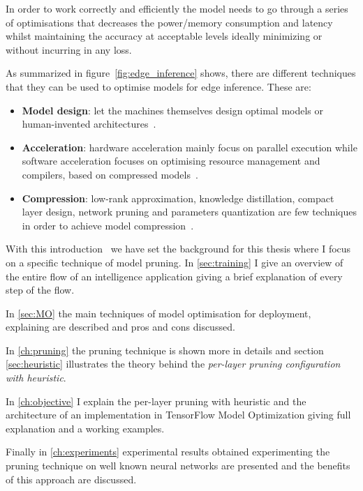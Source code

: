 In order to work correctly and efficiently the model needs to go through a
series of optimisations that decreases the power/memory consumption and latency
whilst maintaining the accuracy at acceptable levels \- ideally minimizing or
without incurring in any loss.

As summarized in figure~\ref{fig:edge_inference} shows, there are different
techniques that they can be used to optimise models for edge inference. These
are:

\begin{itemize}
    \item \textbf{Model design}: let the machines themselves design optimal
        models or human-invented architectures~\cite{xu2020edge}.
    \item \textbf{Acceleration}: hardware acceleration mainly focus on parallel
        execution while software acceleration focuses on optimising resource
        management and compilers, based on compressed models~\cite{xu2020edge}.
    \item \textbf{Compression}: low-rank approximation, knowledge distillation,
        compact layer design, network pruning and parameters quantization are
        few techniques in order to achieve model compression~\cite{xu2020edge}.
\end{itemize}

With this introduction~\cite{xu2020edge} we have set the background for this
thesis where I focus on a specific technique of model pruning.
In \autoref{sec:training} I give an overview of the entire flow of an
intelligence application giving a brief explanation of every step of the flow.

In \autoref{sec:MO} the main techniques of model optimisation for
deployment, explaining are described and pros and cons discussed.

In \autoref{ch:pruning} the pruning technique is shown more in details and
section \autoref{sec:heuristic} illustrates the theory behind the
\textit{per-layer pruning configuration with heuristic}.

In \autoref{ch:objective} I explain the per-layer pruning with heuristic and
the architecture of an implementation in TensorFlow Model Optimization giving
full explanation and a working examples.

Finally in \autoref{ch:experiments} experimental results obtained experimenting
the pruning technique on well known neural networks are presented and the
benefits of this approach are discussed.

